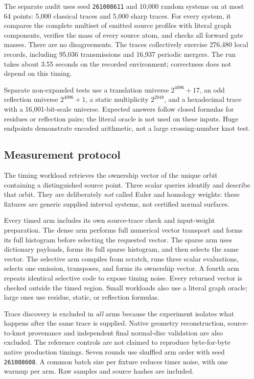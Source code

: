 \documentclass[11pt]{article}
\theoremstyle{definition}\newtheorem{definition}[theorem]{Definition}
\theoremstyle{remark}\newtheorem{remark}[theorem]{Remark}
\begin{document}
The separate audit uses seed \texttt{261008611} and 10,000 random systems on at
most 64 points: 5,000 classical traces and 5,000 sharp traces. For every system,
it compares the complete multiset of emitted source profiles with literal graph
components, verifies the mass of every source atom, and checks all forward gate
masses. There are no disagreements. The traces collectively exercise 276,480
local records, including 95,036 transmissions and 16,937 periodic mergers.
The run takes about 3.55 seconds on the recorded environment; correctness does
not depend on this timing.

Separate non-expanded tests use a translation universe $2^{4096}+17$, an odd
reflection universe $2^{4096}+1$, a static multiplicity $2^{2048}$, and a
hexadecimal trace with a 16,001-bit-scale universe. Expected answers follow
closed formulas for residues or reflection pairs; the literal oracle is not
used on these inputs. Huge endpoints demonstrate encoded arithmetic, not a
large crossing-number knot test.

\subsection{Measurement protocol}
The timing workload retrieves the ownership vector of the unique orbit containing
a distinguished source point. Three scalar queries identify and describe that
orbit. They are deliberately \emph{not} called Euler and homology weights: these
fixtures are generic supplied interval systems, not certified normal surfaces.

Every timed arm includes its own source-trace check and input-weight preparation.
The dense arm performs full numerical vector transport and forms its full
histogram before selecting the requested vector. The sparse arm uses dictionary
payloads, forms its full sparse histogram, and then selects the same vector.
The selective arm compiles from scratch, runs three scalar evaluations, selects
one emission, transposes, and forms its ownership vector. A fourth arm repeats
identical selective code to expose timing noise. Every returned vector is checked
outside the timed region. Small workloads also use a literal graph oracle;
large ones use residue, static, or reflection formulas.

Trace discovery is excluded in \emph{all} arms because the experiment isolates
what happens after the same trace is supplied. Native geometry reconstruction,
source-to-knot provenance and independent final normal-disc validation are also
excluded. The reference controls are not claimed to reproduce byte-for-byte
native production timings. Seven rounds use shuffled arm order with seed
\texttt{261008608}. A common batch size per fixture reduces timer noise, with
one warmup per arm. Raw samples and source hashes are included.
\end{document}
